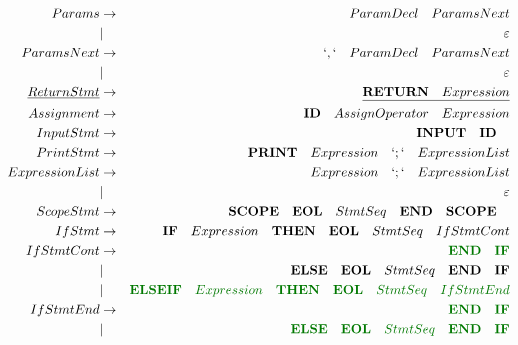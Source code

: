 \documentclass[a4paper,11pt,landscape,leqno]{article}
\begin{document}
\begin{eqnarray}
Params      &    \rightarrow    & {ParamDecl}\quad ParamsNext  \\
            &    |              & \varepsilon             \\
ParamsNext  &    \rightarrow    & `,`\quad {ParamDecl}\quad  ParamsNext   \\
            &    |              & \varepsilon             \\
\underline{ReturnStmt}  &   \rightarrow     & \underline{\textbf{RETURN}\quad Expression}     \\
Assignment  & \rightarrow       & \textbf{ID}\quad AssignOperator \quad Expression \\
InputStmt   &    \rightarrow    & \textbf{INPUT}\quad \textbf{ID}\quad   \\
PrintStmt   &    \rightarrow    & \textbf{PRINT}\quad Expression\quad `;` \quad ExpressionList\\
ExpressionList&  \rightarrow    &  Expression\quad `;`\quad ExpressionList\\
            &    |              & \varepsilon   \\
ScopeStmt   &    \rightarrow    &    \textbf{SCOPE}\quad   \textbf{EOL} \quad StmtSeq\quad   \textbf{END}\quad \textbf{SCOPE}\quad    \\
IfStmt  &    \rightarrow        & \textbf{IF} \quad Expression \quad \textbf{THEN}\quad \textbf{EOL}\quad StmtSeq \quad IfStmtCont   \\
IfStmtCont  &   \rightarrow     & \textcolor{green1}{\textbf{END}\quad \textbf{IF}}  \\
&   |      &    \textbf{ELSE}\quad  \textbf{EOL}\quad StmtSeq\quad \textbf{END}\quad \textbf{IF}   \\
&   |       &    \textcolor{green1}{\textbf{ELSEIF}\quad Expression\quad \textbf{THEN}\quad \textbf{EOL}\quad StmtSeq \quad IfStmtEnd}   \\
IfStmtEnd  &   \rightarrow  &\textcolor{green1}{\textbf{END}\quad \textbf{IF}}  \\
&   |      &    \textcolor{green1}{\textbf{ELSE}\quad  \textbf{EOL}\quad StmtSeq\quad \textbf{END}\quad \textbf{IF}}   \\

\end{eqnarray}
\end{document}

